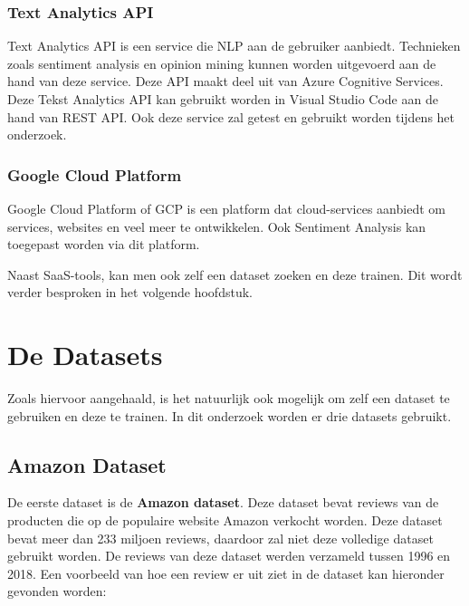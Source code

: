 \subsubsection{Text Analytics API}
\label{textanalytics}

Text Analytics API is een service die NLP aan de gebruiker aanbiedt. Technieken zoals sentiment analysis en opinion mining kunnen worden uitgevoerd aan de hand van deze service. Deze API maakt deel uit van Azure Cognitive Services. \autocite{Microsoft2020} Deze Tekst Analytics API kan gebruikt worden in Visual Studio Code aan de hand van REST API. Ook deze service zal getest en gebruikt worden tijdens het onderzoek.

\subsubsection{Google Cloud Platform}
\label{googlecloudplatform}
Google Cloud Platform of GCP is een platform dat cloud-services aanbiedt om services, websites en veel meer te ontwikkelen. Ook Sentiment Analysis kan toegepast worden via dit platform. \autocite{axxius2021}



Naast SaaS-tools, kan men ook zelf een dataset zoeken en deze trainen. Dit wordt verder besproken in het volgende hoofdstuk.

\section{De Datasets}
\label{datasets} 

Zoals hiervoor aangehaald, is het natuurlijk ook mogelijk om zelf een dataset te gebruiken en deze te trainen. In dit onderzoek worden er drie datasets gebruikt.

\subsection{Amazon Dataset}
\label{amazon}

De eerste dataset is de \textbf{Amazon dataset}. Deze dataset bevat reviews van de producten die op de populaire website Amazon verkocht worden. Deze dataset bevat meer dan 233 miljoen reviews, daardoor zal niet deze volledige dataset gebruikt worden. De reviews van deze dataset werden verzameld tussen 1996 en 2018. \autocite{Ni2019} Een voorbeeld van hoe een review er uit ziet in de dataset kan hieronder gevonden worden: 
  
